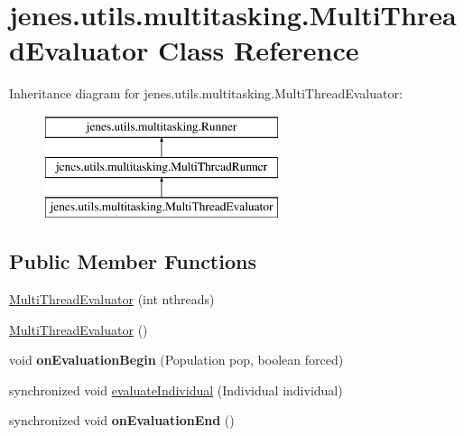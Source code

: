\hypertarget{classjenes_1_1utils_1_1multitasking_1_1_multi_thread_evaluator}{\section{jenes.\-utils.\-multitasking.\-Multi\-Thread\-Evaluator Class Reference}
\label{classjenes_1_1utils_1_1multitasking_1_1_multi_thread_evaluator}
}
Inheritance diagram for jenes.\-utils.\-multitasking.\-Multi\-Thread\-Evaluator\-:\begin{figure}[H]
\begin{center}
\leavevmode
\includegraphics[height=3.000000cm]{classjenes_1_1utils_1_1multitasking_1_1_multi_thread_evaluator}
\end{center}
\end{figure}
\subsection*{Public Member Functions}
\begin{DoxyCompactItemize}
\item 
\hyperlink{classjenes_1_1utils_1_1multitasking_1_1_multi_thread_evaluator_a842d648ae03a8d7f835a24c522d229ae}{Multi\-Thread\-Evaluator} (int nthreads)
\item 
\hyperlink{classjenes_1_1utils_1_1multitasking_1_1_multi_thread_evaluator_ac9949bf8de0efb0cb47feb2df56140ff}{Multi\-Thread\-Evaluator} ()
\item 
\hypertarget{classjenes_1_1utils_1_1multitasking_1_1_multi_thread_evaluator_a2a9d9427ca8c2b8a9dfc541c85bada42}{void {\bfseries on\-Evaluation\-Begin} (Population pop, boolean forced)}\label{classjenes_1_1utils_1_1multitasking_1_1_multi_thread_evaluator_a2a9d9427ca8c2b8a9dfc541c85bada42}

\item 
synchronized void \hyperlink{classjenes_1_1utils_1_1multitasking_1_1_multi_thread_evaluator_ad99c13b137f1089a9f30377548b42e25}{evaluate\-Individual} (Individual individual)
\item 
\hypertarget{classjenes_1_1utils_1_1multitasking_1_1_multi_thread_evaluator_a3cd56b43989da43e4b3c2b79260d5f5f}{synchronized void {\bfseries on\-Evaluation\-End} ()}\label{classjenes_1_1utils_1_1multitasking_1_1_multi_thread_evaluator_a3cd56b43989da43e4b3c2b79260d5f5f}

\end{DoxyCompactItemize}
